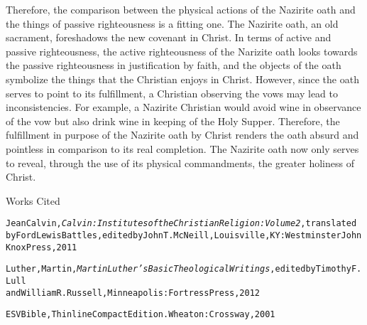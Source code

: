 \documentclass[12pt]{turabian-researchpaper}
\begin{document}
\par
Therefore, the comparison between the physical actions of the Nazirite oath and the things of passive righteousness is a fitting one. 
The Nazirite oath, an old sacrament, foreshadows the new covenant in Christ.  
In terms of active and passive righteousness, the active righteousness of the Narizite oath looks towards the passive righteousness in justification by faith, and the objects of the oath symbolize the things that the Christian enjoys in Christ. 
However, since the oath serves to point to its fulfillment, a Christian observing the vows may lead to inconsistencies.
For example, a Nazirite Christian would avoid wine in observance of the vow but also drink wine in keeping of the Holy Supper.
Therefore, the fulfillment in purpose of the Nazirite oath by Christ renders the oath absurd and pointless in comparison to its real completion.
The Nazirite oath now only serves to reveal, through the use of its physical commandments, the greater holiness of Christ.

\pagebreak
\singlespace
\begin{center}
Works Cited
\end{center}
\begin{alltt}
\normalfont
Jean Calvin, \textit{Calvin: Institutes of the Christian Religion: Volume 2}, translated
             by Ford Lewis Battles, edited by John T. McNeill, Louisville, KY: Westminster John Knox Press, 2011
\end{alltt}





\begin{alltt}
\normalfont
Luther, Martin, \textit{Martin Luther's Basic Theological Writings}, edited by Timothy F. Lull 
             and William R. Russell, Minneapolis: Fortress Press, 2012
\end{alltt} 


\begin{alltt}
\normalfont
ESV Bible, Thinline Compact Edition. Wheaton: Crossway, 2001
\end{alltt}
\end{document}
